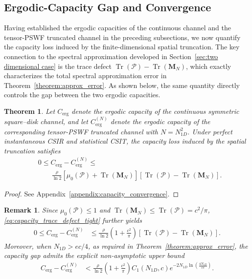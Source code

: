 \documentclass[lettersize,journal]{IEEEtran}
\theoremstyle{plain}
\newtheorem{theorem}{Theorem}
\newtheorem{remark}{Remark}
\begin{document}
\subsection{Ergodic-Capacity Gap and Convergence}
Having established the ergodic capacities of the continuous
channel and the tensor-PSWF truncated channel in the preceding
subsections, we now quantify the capacity loss induced by the
finite-dimensional spatial truncation. The key connection to the
spectral approximation developed in Section~\ref{sec:two dimensional case} is the trace defect
$\operatorname{Tr}(\mathcal{P})-\operatorname{Tr}(\mathbf{M}_N)$,
which exactly characterizes the total spectral approximation error
in Theorem~\ref{theorem:approx_error}. As shown below, the same quantity directly controls
the gap between the two ergodic capacities.

\begin{theorem}
	\label{theorem:capacity_convergence}
	Let $C_{\mathrm{erg}}$ denote the ergodic capacity of the
	continuous symmetric square--disk channel, and let
	$C_{\mathrm{erg}}^{(N)}$ denote the ergodic capacity of the
	corresponding tensor-PSWF truncated channel with
	$N=N_{1D}^2$. Under perfect instantaneous CSIR and
	statistical CSIT, the capacity loss induced by the spatial
	truncation satisfies
	\begin{align}
		&0
		\leq
		C_{\mathrm{erg}}-C_{\mathrm{erg}}^{(N)}\leq\nonumber \\
		&\qquad\frac{\rho}{\ln 2}
		\left[
		\mu_0(\mathcal{P})
		+
		\operatorname{Tr}(\mathbf{M}_N)
		\right]
		\left[
		\operatorname{Tr}(\mathcal{P})
		-
		\operatorname{Tr}(\mathbf{M}_N)
		\right].
		\label{eq:capacity_trace_defect_tight}
	\end{align}
\end{theorem}
\begin{proof}
	See Appendix~\ref{appendix:capacity_convergence}.
\end{proof}
\begin{remark}
	Since
	$\mu_0(\mathcal{P})\leq1$ and
	$\operatorname{Tr}(\mathbf{M}_N)
	\leq\operatorname{Tr}(\mathcal{P})=c^2/\pi$,
	\eqref{eq:capacity_trace_defect_tight} further yields
	\begin{align}
		0
		\leq
		C_{\mathrm{erg}}-C_{\mathrm{erg}}^{(N)}
		&\leq
		\frac{\rho}{\ln 2}
		\left(
		1+\frac{c^2}{\pi}
		\right)
		\left[
		\operatorname{Tr}(\mathcal{P})
		-
		\operatorname{Tr}(\mathbf{M}_N)
		\right].
		\label{eq:capacity_trace_defect}
	\end{align}
	Moreover, when $N_{1D} > ec/4$, as required in Theorem~\ref{theorem:approx_error}, the capacity gap admits the explicit non-asymptotic upper bound
	\begin{align}
		C_{\mathrm{erg}}-C_{\mathrm{erg}}^{(N)}
		&<
		\frac{\rho}{\ln 2}
		\left(
		1+\frac{c^2}{\pi}
		\right)
		C_1(N_{1D},c)
		e^{-2N_{1D}
			\ln\left(\frac{4N_{1D}}{ce}\right)}.
		\label{eq:capacity_convergence}
	\end{align}
\end{remark}
\end{document}
